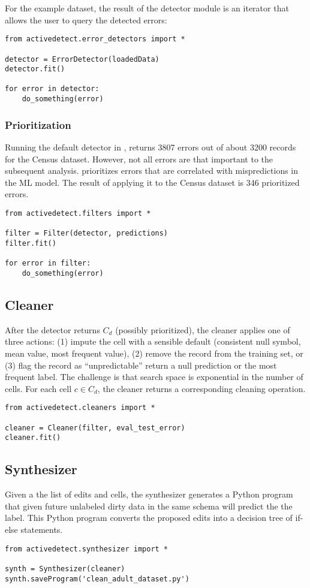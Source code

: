 For the example dataset, the result of the detector module is an iterator that allows the user to query the detected errors:
\begin{lstlisting}
from activedetect.error_detectors import *

detector = ErrorDetector(loadedData)
detector.fit()

for error in detector:
    do_something(error)
\end{lstlisting}

\subsubsection{Prioritization}
Running the default detector in \sys, returns 3807 errors out of about 3200 records for the Census dataset.
However, not all errors are that important to the subsequent analysis. \sys prioritizes errors that are correlated with mispredictions in the ML model. The result of applying it to the Census dataset is 346 prioritized errors.

\begin{lstlisting}
from activedetect.filters import *

filter = Filter(detector, predictions)
filter.fit()

for error in filter:
    do_something(error)
\end{lstlisting}

\subsection{Cleaner}
After the detector returns $C_{d}$ (possibly prioritized), the cleaner applies one of three actions: (1) impute the cell with a sensible default (consistent null symbol, mean value, most frequent value), (2) remove the record from the training set, or (3) flag the record as ``unpredictable'' return a null prediction or the most frequent label. The challenge is that search space is exponential in the number of cells. For each cell $c \in C_{d}$, the cleaner returns a corresponding cleaning operation.

\begin{lstlisting}
from activedetect.cleaners import *

cleaner = Cleaner(filter, eval_test_error)
cleaner.fit()
\end{lstlisting}


\subsection{Synthesizer}
Given a the list of edits and cells, the synthesizer generates a Python program that given future unlabeled dirty data in the same schema will predict the the label. This Python program converts the proposed edits into a decision tree of if-else statements.

\begin{lstlisting}
from activedetect.synthesizer import *

synth = Synthesizer(cleaner)
synth.saveProgram('clean_adult_dataset.py')
\end{lstlisting}


